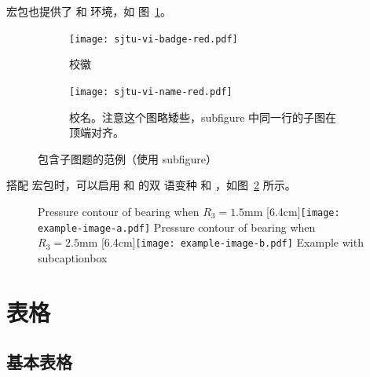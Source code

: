 

 宏包也提供了  和  环境，如
图~\ref{fig:subfigure}。

\begin{figure}[!htp]
  \centering
  \begin{subfigure}{0.3\textwidth}
    \centering
    \texttt{[image: sjtu-vi-badge-red.pdf]}
    \caption{校徽}
  \end{subfigure}
  \hspace{1cm}
  \begin{subfigure}{0.4\textwidth}
    \centering
    \texttt{[image: sjtu-vi-name-red.pdf]}
    \caption{校名。注意这个图略矮些，subfigure 中同一行的子图在顶端对齐。}
  \end{subfigure}
  \caption{包含子图题的范例（使用 subfigure）}
  \label{fig:subfigure}
\end{figure}

搭配  宏包时，可以启用  和  的双
语变种  和 ，如图~\ref{fig:bisubcaptionbox}
所示。

\begin{figure}[!hbtp]
  \centering
                  {Pressure contour of bearing when $R_3 = 1.5\text{mm}$}%
                  [6.4cm]{\texttt{[image: example-image-a.pdf]}}
  \hspace{1cm}
                  {Pressure contour of bearing when $R_3 = 2.5\text{mm}$}%
                  [6.4cm]{\texttt{[image: example-image-b.pdf]}}
            {Example with subcaptionbox}
  \label{fig:bisubcaptionbox}
\end{figure}


\section{表格}

\subsection{基本表格}

